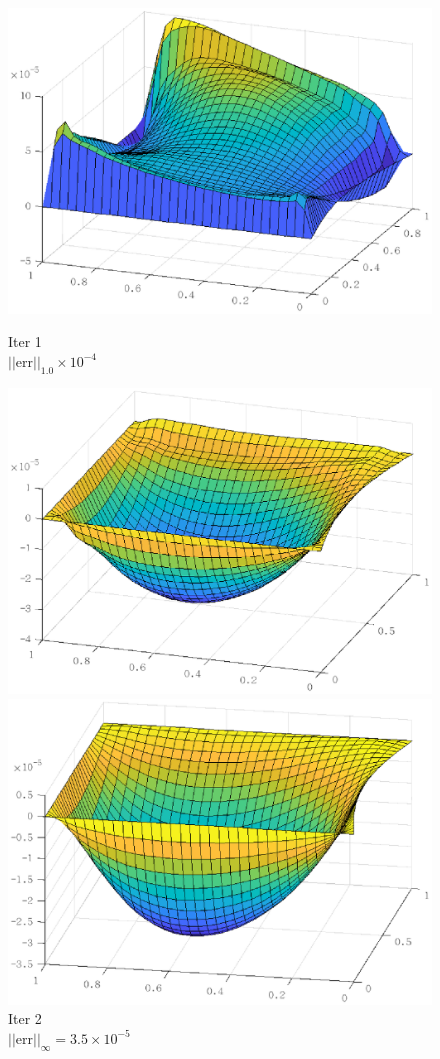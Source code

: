 \documentclass[lang=cn,10pt]{elegantbook}
\begin{document}
\begin{figure}[H]
  \centering
  \begin{minipage}[t]{0.24\linewidth}
      \centering
      \includegraphics[width=0.9\linewidth]{figure/3-4-5.eps}
      \caption*{\small Iter 1 \\ $||\text{err}||_1.0\times 10^{-4}$}
  \end{minipage}
  \begin{minipage}[t]{0.24\linewidth}
    \centering
    \includegraphics[width=0.9\linewidth]{figure/3-4-6.eps}
    \caption*{\small Iter 2 \\ $||\text{err}||_\infty=3.5\times 10^{-5}$}
  \end{minipage}
  \begin{minipage}[t]{0.24\linewidth}
    \centering
    \includegraphics[width=0.9\linewidth]{figure/3-4-7.eps}

\end{minipage}
\end{figure}
\end{document}
